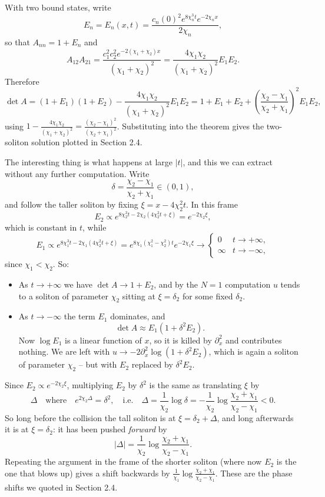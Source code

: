 \begin{example}[$N=2$]
	With two bound states, write
	$$
	E_n = E_n(x,t) = \frac{c_n(0)^2e^{8\chi_n^3t}e^{-2\chi_nx}}{2\chi_n},
	$$
	so that $A_{nn} = 1 + E_n$ and
	$$
	A_{12}A_{21} = \frac{c_1^2c_2^2e^{-2(\chi_1+\chi_2)x}}{(\chi_1+\chi_2)^2} = \frac{4\chi_1\chi_2}{(\chi_1+\chi_2)^2}E_1E_2.
	$$
	Therefore
	$$
	\det A = (1+E_1)(1+E_2) - \frac{4\chi_1\chi_2}{(\chi_1+\chi_2)^2}E_1E_2 = 1 + E_1 + E_2 + \left(\frac{\chi_2-\chi_1}{\chi_2+\chi_1}\right)^2E_1E_2,
	$$
	using $1 - \frac{4\chi_1\chi_2}{(\chi_1+\chi_2)^2} = \frac{(\chi_2-\chi_1)^2}{(\chi_2+\chi_1)^2}$. Substituting into the theorem gives the two-soliton solution plotted in Section 2.4.

	The interesting thing is what happens at large $|t|$, and this we can extract without any further computation. Write
	$$
	\delta = \frac{\chi_2-\chi_1}{\chi_2+\chi_1}\in(0,1),
	$$
	and follow the taller soliton by fixing $\xi = x - 4\chi_2^2t$. In this frame
	$$
	E_2 \propto e^{8\chi_2^3t - 2\chi_2(4\chi_2^2t+\xi)} = e^{-2\chi_2\xi},
	$$
	which is constant in $t$, while
	$$
	E_1\propto e^{8\chi_1^3t - 2\chi_1(4\chi_2^2t + \xi)} = e^{8\chi_1(\chi_1^2-\chi_2^2)t}e^{-2\chi_1\xi}\longrightarrow\begin{cases}0 & t\to+\infty,\\ \infty & t\to-\infty,\end{cases}
	$$
	since $\chi_1 < \chi_2$. So:
	\begin{itemize}
		\item As $t\to+\infty$ we have $\det A\to 1 + E_2$, and by the $N=1$ computation $u$ tends to a soliton of parameter $\chi_2$ sitting at $\xi = \delta_2$ for some fixed $\delta_2$.
		\item As $t\to-\infty$ the term $E_1$ dominates, and
		$$
		\det A \approx E_1\left(1 + \delta^2E_2\right).
		$$
		Now $\log E_1$ is a linear function of $x$, so it is killed by $\partial_x^2$ and contributes nothing. We are left with $u\to-2\partial_x^2\log(1+\delta^2E_2)$, which is again a soliton of parameter $\chi_2$ -- but with $E_2$ replaced by $\delta^2E_2$.
	\end{itemize}
	Since $E_2\propto e^{-2\chi_2\xi}$, multiplying $E_2$ by $\delta^2$ is the same as translating $\xi$ by
	$$
	\Delta \quad\text{where}\quad e^{2\chi_2\Delta} = \delta^2, \quad\text{i.e.}\quad \Delta = \frac{1}{\chi_2}\log\delta = -\frac{1}{\chi_2}\log\frac{\chi_2+\chi_1}{\chi_2-\chi_1} < 0.
	$$
	So long before the collision the tall soliton is at $\xi = \delta_2 + \Delta$, and long afterwards it is at $\xi = \delta_2$: it has been pushed \emph{forward} by
	$$
	|\Delta| = \frac{1}{\chi_2}\log\frac{\chi_2+\chi_1}{\chi_2-\chi_1}.
	$$
	Repeating the argument in the frame of the shorter soliton (where now $E_2$ is the one that blows up) gives a shift backwards by $\frac{1}{\chi_1}\log\frac{\chi_2+\chi_1}{\chi_2-\chi_1}$. These are the phase shifts we quoted in Section 2.4.
\end{example}

